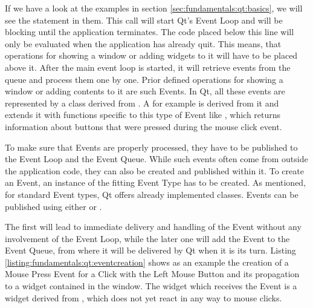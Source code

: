 If we have a look at the examples in section \ref{sec:fundamentals:qt:basics},
we will see the statement  in them. This call will
start Qt's Event Loop and will be blocking until the application terminates.
The code placed below this line will only be evaluated when the application has
already quit. This means, that operations for showing a window or adding widgets
to it will have to be placed above it. After the main event loop is started, it
will retrieve events from the queue and process them one by one. Prior defined
operations for showing a window or adding contents to it are such
Events. In Qt, all these events are represented by a class derived from
. A  for
example is derived from it and extends it with functions specific to this type
of Event like , which returns
information about buttons that were pressed during the mouse click event.

To make sure that Events are properly processed, they have to be published to
the Event Loop and the Event Queue. While such events often come from outside
the application code, they can also be created and published within it. To
create an Event, an instance of the fitting Event Type has to be created. As
mentioned, for standard Event types, Qt offers already implemented classes.
Events can be published using either 
 or
. 

The first will lead to immediate delivery and handling of the Event without
any involvement of the Event Loop, while the later one will add the Event to the
Event Queue, from where it will be delivered by Qt when it is its turn. Listing
\ref{listing:fundamentals:qt:eventcreation} shows as an example the creation of
a Mouse Press Event for a Click with the Left Mouse Button and its propagation
to a widget contained in the window. The widget which receives the Event is a
widget derived from , which does not yet
react in any way to mouse clicks.



